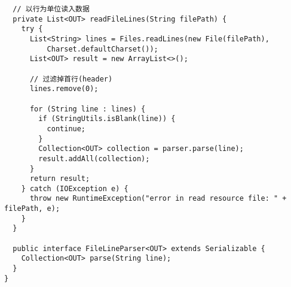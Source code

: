 \begin{center}
\begin{verbatim}
  // 以行为单位读入数据
  private List<OUT> readFileLines(String filePath) {
    try {
      List<String> lines = Files.readLines(new File(filePath),
          Charset.defaultCharset());
      List<OUT> result = new ArrayList<>();

      // 过滤掉首行(header)
      lines.remove(0);

      for (String line : lines) {
        if (StringUtils.isBlank(line)) {
          continue;
        }
        Collection<OUT> collection = parser.parse(line);
        result.addAll(collection);
      }
      return result;
    } catch (IOException e) {
      throw new RuntimeException("error in read resource file: " + filePath, e);
    }
  }

  public interface FileLineParser<OUT> extends Serializable {
    Collection<OUT> parse(String line);
  }
}
\end{verbatim}
\end{center}

